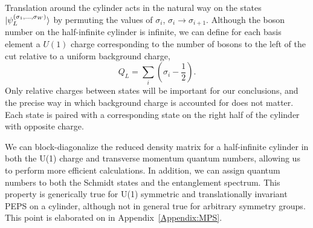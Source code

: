 
Translation around the cylinder acts in the natural way on the states 
$\vert \psi_L^{(\sigma_1, \ldots, \sigma_W)} \rangle$ by permuting the values of 
$\sigma_i$, $\sigma_i \to \sigma_{i+1}$.
Although the boson number on the half-infinite cylinder is infinite, we can define for
each basis element a $U(1)$ charge corresponding to the number of bosons to the
left of the cut relative to a uniform background charge,
\begin{equation}
Q_L = \sum_i (\sigma_i - \frac12).
\end{equation}
Only relative charges between states will be important for our conclusions, and the precise
way in which background charge is accounted for does not matter.
Each state is paired with a corresponding state on the right half of the cylinder with opposite charge.

We can block-diagonalize the reduced density matrix
for a half-infinite cylinder in both the U(1) charge and transverse momentum
quantum numbers, allowing us to perform more efficient calculations. 
In addition, we can assign quantum numbers to both the Schmidt states and the entanglement
spectrum. This property is generically true for U(1) symmetric and translationally invariant PEPS
on a cylinder, although not in general true for arbitrary symmetry groups.
This point is elaborated on in Appendix~\ref{Appendix:MPS}.


